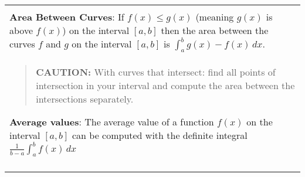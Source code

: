 \documentclass[12pt]{report}
\newenvironment{boxe}
    {\begin{center}
    \begin{tabular}{|p{0.9\textwidth}|}
    \hline\\
    }
    { 
    \\\\\hline
    \end{tabular} 
    \end{center}
    }
\begin{document}
\begin{boxe}
\textbf{Area Between Curves}: If $f(x)\leq g(x)$ (meaning $g(x)$ is above $f(x)$) on the interval $[a,b]$ then the area between the curves $f$ and $g$ on the interval $[a,b]$ is $\displaystyle{\int_{a}^{b}g(x)-f(x)\,dx}$.\\
\begin{quote}
\vspace{-.25in}
    \textbf{CAUTION:} With curves that intersect: find all points of intersection in your interval and compute the area between the intersections separately.
\end{quote}

    \iffalse To the right is a visual example of the area enclosed by the curves $f(x)$ and $g(x)$ and the area \\
    \begin{wrapfigure}{r}{0.20\textwidth}
    \centering
    \texttt{[image: areabetweencurve.png]}
    \end{wrapfigure}
    \fi

\textbf{Average values}: The average value of a function $f(x)$ on the interval $[a,b]$ can be computed with the definite integral $\displaystyle{\frac{1}{b-a}\int_{a}^{b}f(x)\,dx}$
\end{boxe}
\fi
\end{document}
